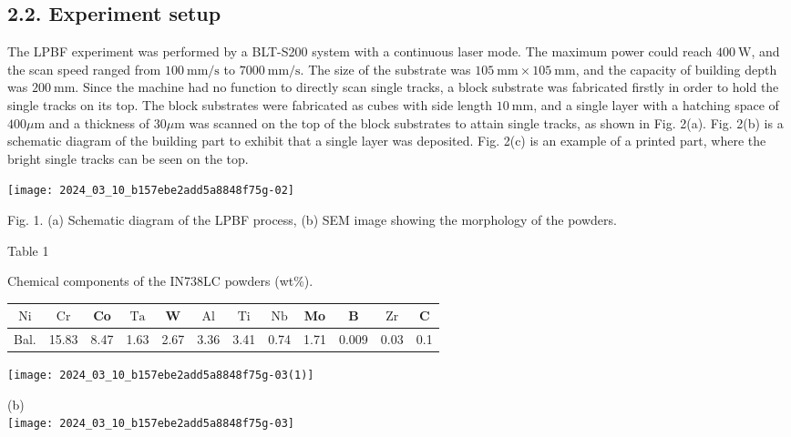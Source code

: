 \documentclass[10pt]{article}
\begin{document}
\subsection*{2.2. Experiment setup}
The LPBF experiment was performed by a BLT-S200 system with a continuous laser mode. The maximum power could reach $400 \mathrm{~W}$, and the scan speed ranged from $100 \mathrm{~mm} / \mathrm{s}$ to $7000 \mathrm{~mm} / \mathrm{s}$. The size of the substrate was $105 \mathrm{~mm} \times 105 \mathrm{~mm}$, and the capacity of building depth was $200 \mathrm{~mm}$. Since the machine had no function to directly scan single tracks, a block substrate was fabricated firstly in order to hold the single tracks on its top. The block substrates were fabricated as cubes with side length $10 \mathrm{~mm}$, and a single layer with a hatching space of $400 \mu \mathrm{m}$ and a thickness of $30 \mu \mathrm{m}$ was scanned on the top of the block substrates to attain single tracks, as shown in Fig. 2(a). Fig. 2(b) is a schematic diagram of the building part to exhibit that a single layer was deposited. Fig. 2(c) is an example of a printed part, where the bright single tracks can be seen on the top.

\begin{center}
\texttt{[image: 2024\_03\_10\_b157ebe2add5a8848f75g-02]}
\end{center}

Fig. 1. (a) Schematic diagram of the LPBF process, (b) SEM image showing the morphology of the powders.

Table 1

Chemical components of the IN738LC powders (wt\%).

\begin{center}
\begin{tabular}{|c|c|c|c|c|c|c|c|c|c|c|c|}
\hline
$\mathrm{Ni}$ & $\mathrm{Cr}$ & Co & $\mathrm{Ta}$ & W & $\mathrm{Al}$ & $\mathrm{Ti}$ & $\mathrm{Nb}$ & Mo & B & $\mathrm{Zr}$ & C \\
\hline
Bal. & 15.83 & 8.47 & 1.63 & 2.67 & 3.36 & 3.41 & 0.74 & 1.71 & 0.009 & 0.03 & 0.1 \\
\hline
\end{tabular}
\end{center}

\begin{center}
\texttt{[image: 2024\_03\_10\_b157ebe2add5a8848f75g-03(1)]}
\end{center}

(b)\\
\texttt{[image: 2024\_03\_10\_b157ebe2add5a8848f75g-03]}
\end{document}
